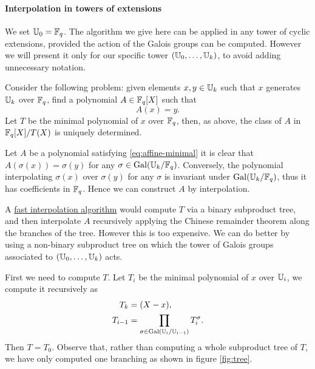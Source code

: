 \paragraph{Interpolation in towers of extensions}
We set $\mathbb{U}_0=\mathbb{F}_q$. The algorithm we give here can be applied in any
tower of cyclic extensions, provided the action of the Galois groups
can be computed. However we will present it only for our specific
tower $(\mathbb{U}_0,\dots,\mathbb{U}_k)$, to avoid adding unnecessary notation.

Consider the following problem: given elements $x,y\in\mathbb{U}_k$ such that
$x$ generates $\mathbb{U}_k$ over $\mathbb{F}_q$, find a polynomial $A\in\mathbb{F}_q[X]$ such
that
\begin{equation}
  \label{eq:affine-minimal}
  A(x) = y
  \text{.}
\end{equation}
Let $T$ be the minimal polynomial of $x$ over $\mathbb{F}_q$, then, as above,
the class of $A$ in $\mathbb{F}_q[X]/T(X)$ is uniquely determined.

Let $A$ be a polynomial satisfying \eqref{eq:affine-minimal} it is
clear that $A(\sigma(x)) = \sigma(y)$ for any
$\sigma\in\operatorname{Gal}(\mathbb{U}_k/\mathbb{F}_q)$. Conversely, the polynomial interpolating
$\sigma(x)$ over $\sigma(y)$ for any $\sigma$ is invariant under
$\operatorname{Gal}(\mathbb{U}_k/\mathbb{F}_q)$, thus it has coefficients in $\mathbb{F}_q$. Hence we can
construct $A$ by interpolation.

A \hyperref[sec:chin-rema-algor]{fast interpolation algorithm} would
compute $T$ via a binary subproduct tree, and then interpolate $A$
recursively applying the Chinese remainder theorem along the branches
of the tree. However this is too expensive. We can do better by using
a non-binary subproduct tree on which the tower of Galois groups
associated to $(\mathbb{U}_0,\ldots,\mathbb{U}_k)$ acts.

First we need to compute $T$. Let $T_i$ be the minimal polynomial of
$x$ over $\mathbb{U}_i$, we compute it recursively as
\begin{align}
  T_k &= (X - x)\text{,}\\
  \label{eq:minprod}
  T_{i-1} &= \prod_{\sigma\in\operatorname{Gal}(\mathbb{U}_{i}/\mathbb{U}_{i-1})}T_{i}^\sigma\text{.}
\end{align}
Then $T=T_0$. Observe that, rather than computing a whole subproduct
tree of $T$, we have only computed one branching as shown in figure
\ref{fig:tree}.

